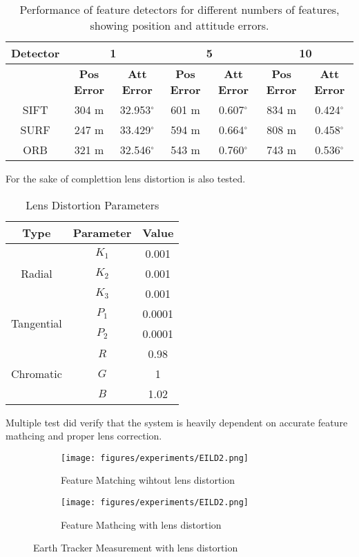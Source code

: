 \begin{table}[H]
\centering
\begin{tabular}{|c|c|c|c|c|c|c|}
\hline
\textbf{Detector} & \multicolumn{2}{c|}{\textbf{1}} & \multicolumn{2}{c|}{\textbf{5}} & \multicolumn{2}{c|}{\textbf{10}} \\ \hline
 & \textbf{Pos Error} & \textbf{Att Error} & \textbf{Pos Error} & \textbf{Att Error} & \textbf{Pos Error} & \textbf{Att Error} \\ \hline
SIFT & 304 m & 32.953$^{\circ}$ & 601 m & 0.607$^{\circ}$ & 834 m & 0.424$^{\circ}$ \\ \hline
SURF & 247 m & 33.429$^{\circ}$ & 594 m & 0.664$^{\circ}$ & 808 m & 0.458$^{\circ}$ \\ \hline
ORB  & 321 m & 32.546$^{\circ}$ & 543 m & 0.760$^{\circ}$ & 743 m & 0.536$^{\circ}$ \\ \hline
\end{tabular}
\caption{Performance of feature detectors for different numbers of features, showing position and attitude errors.}
\label{tab:feature_detectors_split}
\end{table}

For the sake of complettion lens distortion is also tested.

\begin{table}[H]
\centering
\caption{Lens Distortion Parameters}
\begin{tabular}{|c|c|c|}
\hline
\textbf{Type} & \textbf{Parameter} & \textbf{Value} \\ \hline
\multirow{3}{*}{Radial} & $K_1$ & 0.001 \\ 
 & $K_2$ & 0.001 \\ 
 & $K_3$ & 0.001 \\ \hline
\multirow{2}{*}{Tangential} & $P_1$ & 0.0001 \\ 
 & $P_2$ & 0.0001 \\ \hline
\multirow{3}{*}{Chromatic} & $R$ & 0.98 \\ 
 & $G$ & 1 \\ 
 & $B$ & 1.02 \\ \hline
\end{tabular}
\end{table}

Multiple test did verify that the system is heavily dependent on accurate feature mathcing and proper lens correction.

\begin{figure}[H]
    \centering
    \begin{subfigure}[b]{0.48\linewidth}
        \centering
        \texttt{[image: figures/experiments/EILD2.png]}
        \caption{Feature Matching wihtout lens distortion}
        \label{fig:ETMeasurement}
    \end{subfigure}
    \hfill
    \begin{subfigure}[b]{0.48\linewidth}
        \centering
        \texttt{[image: figures/experiments/EILD2.png]}
        \caption{Feature Mathcing with lens distortion}
        \label{fig:ETMeasurementError}
    \end{subfigure}
    \caption{Earth Tracker Measurement with lens distortion}
    \label{fig:ETMeas}
\end{figure}


